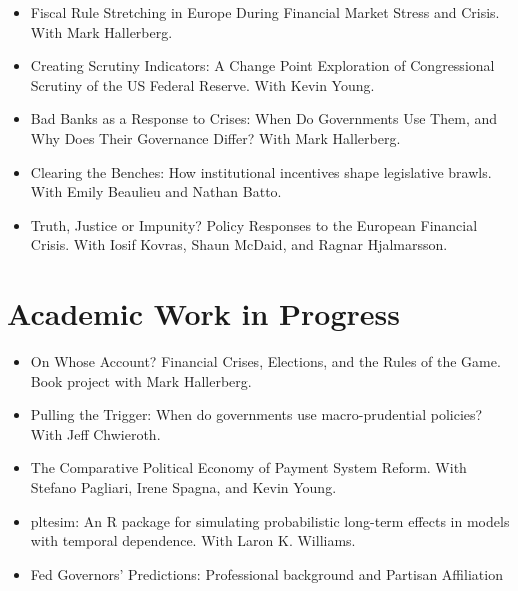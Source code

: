 \documentclass[a4paper]{article}
\begin{document}
{\begin{itemize}
    \item Fiscal Rule Stretching in Europe During Financial Market Stress and Crisis. With Mark Hallerberg.

    \item Creating Scrutiny Indicators: A Change Point Exploration of Congressional Scrutiny of the US Federal Reserve. With Kevin Young.

    \item Bad Banks as a Response to Crises: When Do Governments Use Them, and Why Does Their Governance Differ? With Mark Hallerberg.

    \item Clearing the Benches: How institutional incentives shape legislative brawls. With Emily Beaulieu and Nathan Batto.

    \item Truth, Justice or Impunity? Policy Responses to the European Financial Crisis. With Iosif Kovras, Shaun McDaid, and Ragnar Hjalmarsson.

\end{itemize}

\section*{Academic Work in Progress}

\begin{itemize}

    \item On Whose Account? Financial Crises, Elections, and the Rules of the Game. Book project with Mark Hallerberg.

    \item Pulling the Trigger: When do governments use macro-prudential policies? With Jeff Chwieroth.

    \item The Comparative Political Economy of Payment System Reform. With Stefano Pagliari, Irene Spagna, and Kevin Young.

    \item pltesim: An R package for simulating probabilistic long-term effects in models with temporal dependence. With Laron K. Williams.

    \item Fed Governors' Predictions: Professional background and Partisan Affiliation

\end{itemize}


}
\end{document}
